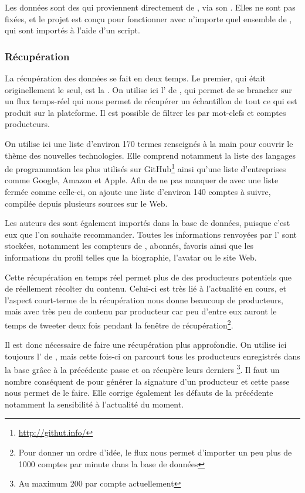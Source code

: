 Les données sont des \tweets{} qui proviennent directement de \twt{}, via son
\api{}. Elles ne sont pas fixées, et le projet est conçu pour fonctionner avec
n’importe quel ensemble de \tweets{}, qui sont importés à l’aide d’un script.

\subsubsection{Récupération}

La récupération des données se fait en deux temps. Le premier, qui était
originellement le seul, est la . On utilise ici l’\api{}
 de \twt{}, qui permet de se brancher sur un flux temps-réel qui
nous permet de récupérer un échantillon de tout ce qui est produit sur la
plateforme. Il est possible de filtrer les \tweets{} par mot-clefs et comptes
producteurs.

On utilise ici une liste d’environ 170 termes renseignés à la main pour couvrir
le thème des nouvelles technologies. Elle comprend notamment la liste des
langages de programmation les plus utilisés sur
GitHub\footnote{\url{http://githut.info/}} ainsi qu’une liste d’entreprises
comme Google, Amazon et Apple. Afin de ne pas manquer de \tweets{} avec une
liste fermée comme celle-ci, on ajoute une liste d’environ 140 comptes à
suivre, compilée depuis plusieurs sources sur le Web.

Les auteurs des \tweets{} sont également importés dans la base de données,
puisque c’est eux que l’on souhaite recommander. Toutes les informations
renvoyées par l’\api{} sont stockées, notamment les compteurs de \tweets{},
abonnés, favoris ainsi que les informations du profil telles que la biographie,
l’avatar ou le site Web.

Cette récupération en temps réel permet plus de  des producteurs
potentiels que de réellement récolter du contenu. Celui-ci est très lié à
l’actualité en cours, et l’aspect court-terme de la récupération nous donne
beaucoup de producteurs, mais avec très peu de contenu par producteur car peu
d’entre eux auront le temps de tweeter deux fois pendant la fenêtre de
récupération\footnote{Pour donner un ordre d’idée, le flux nous permet
d’importer un peu plus de 1000 comptes par minute dans la base de données}.

Il est donc nécessaire de faire une récupération plus approfondie. On utilise
ici toujours l’\api{} de \twt{}, mais cette fois-ci on parcourt tous les
producteurs enregistrés dans la base grâce à la précédente passe et on récupère
leurs derniers \tweets{}\footnote{Au maximum 200 par compte actuellement}. Il
faut un nombre conséquent de \tweets{} pour générer la signature d’un
producteur et cette passe nous permet de le faire. Elle corrige également les
défauts de la précédente notamment la sensibilité à l’actualité du moment.

